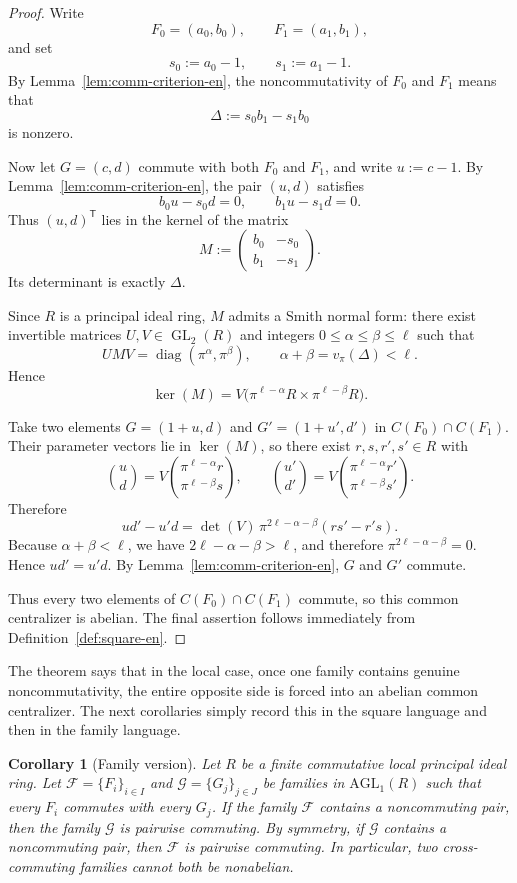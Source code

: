 \documentclass[11pt]{article}
\newcommand{\AGL}{\mathrm{AGL}_1}
\theoremstyle{uprightthm}
\newtheorem{corollary}[theorem]{Corollary}
\begin{document}
\begin{proof}
Write
\[
F_0=(a_0,b_0),\qquad F_1=(a_1,b_1),
\]
and set
\[
s_0:=a_0-1,\qquad s_1:=a_1-1.
\]
By Lemma~\ref{lem:comm-criterion-en}, the noncommutativity of $F_0$ and $F_1$
means that
\[
\Delta:=s_0b_1-s_1b_0
\]
is nonzero.

Now let $G=(c,d)$ commute with both $F_0$ and $F_1$, and write $u:=c-1$. By
Lemma~\ref{lem:comm-criterion-en}, the pair $(u,d)$ satisfies
\[
b_0u-s_0d=0,\qquad b_1u-s_1d=0.
\]
Thus $(u,d)^{\mathsf T}$ lies in the kernel of the matrix
\[
M:=
\begin{pmatrix}
b_0 & -s_0\\
b_1 & -s_1
\end{pmatrix}.
\]
Its determinant is exactly $\Delta$.

Since $R$ is a principal ideal ring, $M$ admits a Smith normal form:
there exist invertible matrices $U,V\in \operatorname{GL}_2(R)$ and integers
$0\le \alpha\le \beta\le \ell$ such that
\[
UMV=\operatorname{diag}(\pi^\alpha,\pi^\beta),
\qquad
\alpha+\beta=v_\pi(\Delta)<\ell.
\]
Hence
\[
\ker(M)=V\bigl(\pi^{\ell-\alpha}R\times \pi^{\ell-\beta}R\bigr).
\]

Take two elements $G=(1+u,d)$ and $G'=(1+u',d')$ in $C(F_0)\cap C(F_1)$. Their
parameter vectors lie in $\ker(M)$, so there exist $r,s,r',s'\in R$ with
\[
\binom{u}{d}
=
V\binom{\pi^{\ell-\alpha}r}{\pi^{\ell-\beta}s},
\qquad
\binom{u'}{d'}
=
V\binom{\pi^{\ell-\alpha}r'}{\pi^{\ell-\beta}s'}.
\]
Therefore
\[
ud'-u'd
=
\det(V)\,\pi^{2\ell-\alpha-\beta}(rs'-r's).
\]
Because $\alpha+\beta<\ell$, we have $2\ell-\alpha-\beta>\ell$, and therefore
$\pi^{2\ell-\alpha-\beta}=0$. Hence $ud'=u'd$. By
Lemma~\ref{lem:comm-criterion-en}, $G$ and $G'$ commute.

Thus every two elements of $C(F_0)\cap C(F_1)$ commute, so this common
centralizer is abelian. The final assertion follows immediately from
Definition~\ref{def:square-en}.
\end{proof}

The theorem says that in the local case, once one family contains genuine
noncommutativity, the entire opposite side is forced into an abelian common
centralizer. The next corollaries simply record this in the square language and
then in the family language.

\begin{corollary}[Family version]
\label{cor:family-local-en}
Let $R$ be a finite commutative local principal ideal ring. Let
$\mathcal F=\{F_i\}_{i\in I}$ and $\mathcal G=\{G_j\}_{j\in J}$ be families in
$\AGL(R)$ such that every $F_i$ commutes with every $G_j$. If the family
$\mathcal F$ contains a noncommuting pair, then the family $\mathcal G$ is
pairwise commuting. By symmetry, if $\mathcal G$ contains a noncommuting pair,
then $\mathcal F$ is pairwise commuting. In particular, two cross-commuting
families cannot both be nonabelian.
\end{corollary}
\end{document}
